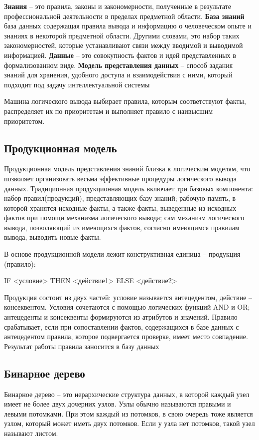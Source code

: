 \documentclass[a4paper, final]{article}
\begin{document}
\textbf{Знания} – это правила, законы и закономерности, полученные в результате профессиональной деятельности в пределах предметной области. \textbf{База знаний} база данных содержащая правила вывода и информацию о человеческом опыте и знаниях в некоторой предметной области. Другими словами, это набор таких закономерностей, которые устанавливают связи между вводимой и выводимой информацией. \textbf{Данные} – это совокупность фактов и идей представленных в формализованном виде. \textbf{Модель представления данных} – способ задания знаний для хранения, удобного доступа и взаимодействия с ними, который подходит под
задачу интеллектуальной системы

Машина логического вывода выбирает правила, которым соответствуют факты, распределяет их по приоритетам и выполняет правило с наивысшим приоритетом.

\subsection{Продукционная модель}

Продукционная модель представления знаний близка к логическим моделям, что позволяет  организовать весьма эффективные процедуры логического вывода данных. Традиционная продукционная модель включает три базовых компонента: набор правил(продукций), представляющих базу знаний; рабочую память, в которой хранятся исходные факты, а также факты, выведенные из исходных фактов при помощи механизма логического вывода; сам механизм логического вывода, позволяющий из имеющихся фактов, согласно имеющимся правилам вывода, выводить новые факты.

В основе продукционной модели лежит конструктивная единица -- продукция (правило):

IF <условие> THEN <действие1> ELSE <действие2>

Продукция состоит из двух частей: условие называется антецедентом, действие -- консеквентом. Условия сочетаются с помощью логических функций AND и OR; антецеденты и консеквенты формируются из атрибутов и значений. Правило срабатывает, если при сопоставлении фактов, содержащихся в базе данных с антецедентом правила, которое подвергается проверке, имеет место совпадение. Результат работы правила заносится в базу данных

\subsection{Бинарное дерево}

Бинарное дерево -- это иерархические структура данных, в которой каждый узел имеет не более двух дочерних узлов. Узлы обычно называются правыми и левыми потомками. При этом каждый из потомков, в свою очередь тоже является узлом, который может иметь двух потомков. Если у узла нет потомков, такой узел называют листом. 
\end{document}
